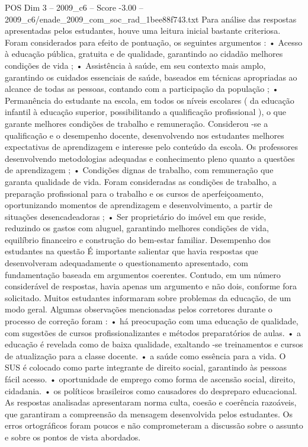 \begin{textsample}{POS Dim 3 – 2009\_c6 – Score -3.00 – 2009\_c6/enade\_2009\_com\_soc\_rad\_1bee88f743.txt}
Para análise das respostas apresentadas pelos estudantes, houve uma leitura inicial bastante criteriosa.
Foram considerados para efeito de pontuação, os seguintes argumentos : • Acesso à educação pública, gratuita e de qualidade, garantindo ao cidadão melhores condições de vida ; • Assistência à saúde, em seu contexto mais amplo, garantindo os cuidados essenciais de saúde, baseados em técnicas apropriadas ao alcance de todas as pessoas, contando com a participação da população ; • Permanência do estudante na escola, em todos os níveis escolares ( da educação infantil à educação superior, possibilitando a qualificação profissional ), o que garante melhores condições de trabalho e remuneração.
Considerou -se a qualificação e o desempenho docente, desenvolvendo nos estudantes melhores expectativas de aprendizagem e interesse pelo conteúdo da escola.
Os professores desenvolvendo metodologias adequadas e conhecimento pleno quanto a questões de aprendizagem ; • Condições dignas de trabalho, com remuneração que garanta qualidade de vida.
Foram consideradas as condições de trabalho, a preparação profissional para o trabalho e os cursos de aperfeiçoamento, oportunizando momentos de aprendizagem e desenvolvimento, a partir de situações desencadeadoras ; • Ser proprietário do imóvel em que reside, reduzindo os gastos com aluguel, garantindo melhores condições de vida, equilíbrio financeiro e construção do bem-estar familiar.
Desempenho dos estudantes na questão É importante salientar que havia respostas que desenvolveram adequadamente o questionamento apresentado, com fundamentação baseada em argumentos coerentes.
Contudo, em um número considerável de respostas, havia apenas um argumento e não dois, conforme fora solicitado.
Muitos estudantes informaram sobre problemas da educação, de um modo geral.
Algumas observações mencionadas pelos corretores durante o processo de correção foram : • há preocupação com uma educação de qualidade, com sugestões de cursos profissionalizantes e métodos preparatórios de aulas. • a educação é revelada como de baixa qualidade, exaltando -se treinamentos e cursos de atualização para a classe docente. • a saúde como essência para a vida.
O SUS é colocado como parte integrante de direito social, garantindo às pessoas fácil acesso. • oportunidade de emprego como forma de ascensão social, direito, cidadania. • os políticos brasileiros como causadores do despreparo educacional.
As respostas analisadas apresentaram norma culta, coesão e coerência razoáveis, que garantiram a compreensão da mensagem desenvolvida pelos estudantes.
Os erros ortográficos foram poucos e não comprometeram a discussão sobre o assunto e sobre os pontos de vista abordados.

\end{textsample}
